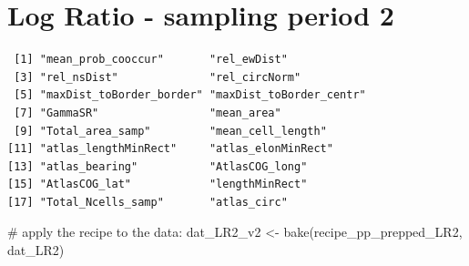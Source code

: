 \documentclass[
  letterpaper,
  DIV=11,
  numbers=noendperiod]{scrreprt}
\newenvironment{Shaded}{\begin{snugshade}}{\end{snugshade}}
\newcommand{\AttributeTok}[1]{\textcolor[rgb]{0.40,0.45,0.13}{#1}}
\newcommand{\CommentTok}[1]{\textcolor[rgb]{0.37,0.37,0.37}{#1}}
\newcommand{\DecValTok}[1]{\textcolor[rgb]{0.68,0.00,0.00}{#1}}
\newcommand{\FunctionTok}[1]{\textcolor[rgb]{0.28,0.35,0.67}{#1}}
\newcommand{\NormalTok}[1]{\textcolor[rgb]{0.00,0.23,0.31}{#1}}
\newcommand{\OtherTok}[1]{\textcolor[rgb]{0.00,0.23,0.31}{#1}}
\newcommand{\SpecialCharTok}[1]{\textcolor[rgb]{0.37,0.37,0.37}{#1}}
\begin{document}
\section{Log Ratio - sampling period 2}

\begin{Shaded}
\end{Shaded}

\begin{verbatim}
 [1] "mean_prob_cooccur"       "rel_ewDist"             
 [3] "rel_nsDist"              "rel_circNorm"           
 [5] "maxDist_toBorder_border" "maxDist_toBorder_centr" 
 [7] "GammaSR"                 "mean_area"              
 [9] "Total_area_samp"         "mean_cell_length"       
[11] "atlas_lengthMinRect"     "atlas_elonMinRect"      
[13] "atlas_bearing"           "AtlasCOG_long"          
[15] "AtlasCOG_lat"            "lengthMinRect"          
[17] "Total_Ncells_samp"       "atlas_circ"             
\end{verbatim}

\begin{Shaded}
\begin{Highlighting}[]
\CommentTok{\# apply the recipe to the data:}
\NormalTok{dat\_LR2\_v2 }\OtherTok{\textless{}{-}} \FunctionTok{bake}\NormalTok{(recipe\_pp\_prepped\_LR2, dat\_LR2)}
\end{Highlighting}
\end{Shaded}
\end{document}
